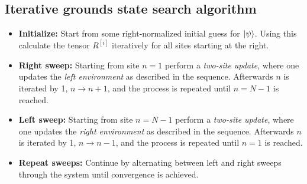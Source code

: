 \subsection{Iterative grounds state search algorithm}
\begin{itemize}
\item[]
\textbf{Initialize:} Start from some right-normalized initial guess for $\ket{\psi}$. Using this calculate the tensor $R^{[i]}$ iteratively for all sites starting at the right.

\item[]
\textbf{Right sweep:} Starting from site $n = 1$ perform a \textit{two-site update}, where one updates the \textit{left environment} as described in the sequence. Afterwards $n$ is iterated by 1, $n \rightarrow n + 1$, and the process is repeated until $n = N-1$ is reached.

\item[]
\textbf{Left sweep:} Starting from site $n = N-1$ perform a \textit{two-site update}, where one updates the \textit{right environment} as described in the sequence. Afterwards $n$ is iterated by 1, $n \rightarrow n - 1$, and the process is repeated until $n = 1$ is reached.

\item[]
\textbf{Repeat sweeps:} Continue by alternating between left and right sweeps through the system until convergence is achieved.  
\end{itemize}